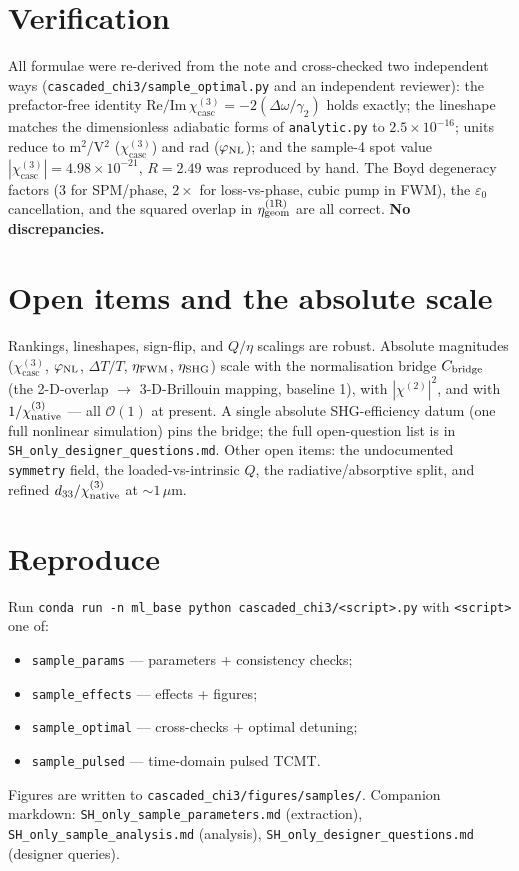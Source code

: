 \documentclass[11pt,a4paper]{article}
\newcommand{\eps}{\varepsilon}
\newcommand{\chitwo}{\chi^{(2)}}
\newcommand{\chithree}{\chi^{(3)}}
\newcommand{\Dom}{\Delta\omega}
\newcommand{\geom}{{\rm geom}}
\newcommand{\chicasc}{\chithree_{\text{casc}}}
\newcommand{\etag}{\eta_{\geom}^{(1\mathrm R)}}
\begin{document}
\section{Verification}
\label{sec:verify}

All formulae were re-derived from the note and cross-checked two independent ways
(\texttt{cascaded\_chi3/sample\_optimal.py} and an independent reviewer): the
prefactor-free identity $\mathrm{Re}/\mathrm{Im}\,\chicasc=-2(\Dom/\gamma_2)$ holds
exactly; the lineshape matches the dimensionless adiabatic forms of
\texttt{analytic.py} to $2.5\times10^{-16}$; units reduce to m$^2$/V$^2$
($\chicasc$) and rad ($\varphi_{\rm NL}$); and the sample-4 spot value
$|\chicasc|=4.98\times10^{-21}$, $R=2.49$ was reproduced by hand. The Boyd
degeneracy factors (3 for SPM/phase, $2\times$ for loss-vs-phase, cubic pump in
FWM), the $\eps_0$ cancellation, and the squared overlap in $\etag$ are all
correct. \textbf{No discrepancies.}

\section{Open items and the absolute scale}
\label{sec:open}

Rankings, lineshapes, sign-flip, and $Q/\eta$ scalings are robust. Absolute
magnitudes ($\chicasc$, $\varphi_{\rm NL}$, $\Delta T/T$, $\eta_{\rm FWM}$,
$\eta_{\rm SHG}$) scale with the normalisation bridge $C_{\rm bridge}$ (the
2-D-overlap $\to$ 3-D-Brillouin mapping, baseline 1), with $|\chitwo|^2$, and with
$1/\chithree_{\rm native}$ --- all $\mathcal{O}(1)$ at present. A single absolute
SHG-efficiency datum (one full nonlinear simulation) pins the bridge; the full
open-question list is in \texttt{SH\_only\_designer\_questions.md}. Other open items: the undocumented
\texttt{symmetry} field, the loaded-vs-intrinsic $Q$, the radiative/absorptive
split, and refined $d_{33}/\chithree_{\rm native}$ at $\sim\!1\,\mu$m.

\section{Reproduce}
\label{sec:code}

Run \texttt{conda run -n ml\_base python cascaded\_chi3/<script>.py} with
\texttt{<script>} one of:
\begin{itemize}[nosep]
  \item \texttt{sample\_params} --- parameters + consistency checks;
  \item \texttt{sample\_effects} --- effects + figures;
  \item \texttt{sample\_optimal} --- cross-checks + optimal detuning;
  \item \texttt{sample\_pulsed} --- time-domain pulsed TCMT.
\end{itemize}
Figures are written to \texttt{cascaded\_chi3/figures/samples/}. Companion
markdown: \texttt{SH\_only\_sample\_parameters.md} (extraction),
\texttt{SH\_only\_sample\_analysis.md} (analysis),
\texttt{SH\_only\_designer\_questions.md} (designer queries).
\end{document}
